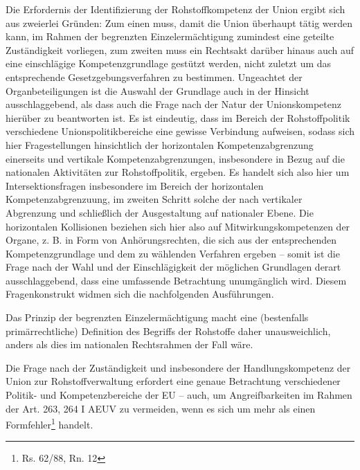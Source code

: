 \documentclass[12pt,a4paper,oneside]{book} %
\begin{document}
Die Erfordernis der Identifizierung der Rohstoffkompetenz der Union ergibt sich aus zweierlei Gründen: Zum einen muss, damit die Union überhaupt tätig werden kann, im Rahmen der begrenzten Einzelermächtigung zumindest eine geteilte Zuständigkeit vorliegen, zum zweiten muss ein Rechtsakt darüber hinaus auch auf eine einschlägige Kompetenzgrundlage gestützt werden, nicht zuletzt um das entsprechende Gesetzgebungsverfahren zu bestimmen. Ungeachtet der Organbeteiligungen ist die Auswahl der Grundlage auch in der Hinsicht ausschlaggebend, als dass auch die Frage nach der Natur der Unionskompetenz hierüber zu beantworten ist. Es ist eindeutig, dass im Bereich der Rohstoffpolitik verschiedene Unionspolitikbereiche eine gewisse Verbindung aufweisen, sodass sich hier Fragestellungen hinsichtlich der horizontalen Kompetenzabgrenzung einerseits und vertikale Kompetenzabgrenzungen, insbesondere in Bezug auf die nationalen Aktivitäten zur Rohstoffpolitik, ergeben. Es handelt sich also hier um Intersektionsfragen insbesondere im Bereich der horizontalen Kompetenzabgrenzuung, im zweiten Schritt solche der nach vertikaler Abgrenzung und schließlich der Ausgestaltung auf nationaler Ebene. Die horizontalen Kollisionen beziehen sich hier also auf Mitwirkungskompetenzen der Organe, z. B. in Form von Anhörungsrechten, die sich aus der entsprechenden Kompetenzgrundlage und dem zu wählenden Verfahren ergeben -- somit ist die Frage nach der Wahl und der Einschlägigkeit der möglichen Grundlagen derart ausschlaggebend, dass eine umfassende Betrachtung unumgänglich wird. Diesem Fragenkonstrukt widmen sich die nachfolgenden Ausführungen.

Das Prinzip der begrenzten Einzelermächtigung macht eine (bestenfalls primärrechtliche) Definition des Begriffs der Rohstoffe daher unausweichlich, anders als dies im nationalen Rechtsrahmen der Fall wäre.
	
Die Frage nach der Zuständigkeit und insbesondere der Handlungskompetenz der Union zur Rohstoffverwaltung erfordert eine genaue Betrachtung verschiedener Politik- und Kompetenzbereiche der EU -- auch, um Angreifbarkeiten im Rahmen der Art. 263, 264 I AEUV zu vermeiden, wenn es sich um mehr als einen \glqq Formfehler\grqq\footnote{Rs. 62/88, Rn. 12} handelt.
	
\end{document}
